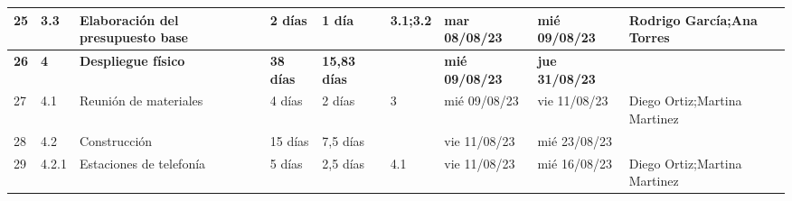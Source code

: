 \begin{landscape}
\begin{table}[p]
\begin{tabular}{|l|l|p{5.5cm}|l|l|l|l|l|p{5.5cm}|}
    25 & 3.3 & Elaboración del presupuesto base & 2 días & 1 día & 3.1;3.2 & mar 08/08/23 & mié 09/08/23 & Rodrigo García;Ana Torres \\ \hline
    \textbf{26} & \textbf{4} & \textbf{Despliegue físico} & \textbf{38 días} & \textbf{15,83 días} & \textbf{} & \textbf{mié 09/08/23} & \textbf{jue 31/08/23} & \textbf{} \\ \hline
    27 & 4.1 & Reunión de materiales & 4 días & 2 días & 3 & mié 09/08/23 & vie 11/08/23 & Diego Ortiz;Martina Martinez \\ \hline
    28 & 4.2 & Construcción & 15 días & 7,5 días &  & vie 11/08/23 & mié 23/08/23 &  \\ \hline
    29 & 4.2.1 & Estaciones de telefonía & 5 días & 2,5 días & 4.1 & vie 11/08/23 & mié 16/08/23 & Diego Ortiz;Martina Martinez \\ \hline
    \end{tabular}%
    \end{table}
\end{landscape}







